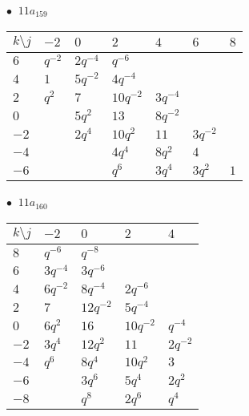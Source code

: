 \begin{minipage}{\linewidth}
$\bullet\ $ $11a_{159}$ \vspace{0.5em} \\
\begin{tabular}{l|llllll}
$k \setminus j$ & $-2$ & $0$ & $2$ & $4$ & $6$ & $8$ \\
\hline
$6$ & $q^{-2}$ & $2q^{-4}$ & $q^{-6}$ &  &  &  \\
$4$ & $1$ & $5q^{-2}$ & $4q^{-4}$ &  &  &  \\
$2$ & $q^{2}$ & $7$ & $10q^{-2}$ & $3q^{-4}$ &  &  \\
$0$ &  & $5q^{2}$ & $13$ & $8q^{-2}$ &  &  \\
$-2$ &  & $2q^{4}$ & $10q^{2}$ & $11$ & $3q^{-2}$ &  \\
$-4$ &  &  & $4q^{4}$ & $8q^{2}$ & $4$ &  \\
$-6$ &  &  & $q^{6}$ & $3q^{4}$ & $3q^{2}$ & $1$ \\
\end{tabular}
\vspace{2em}
\end{minipage}
%
\begin{minipage}{\linewidth}
$\bullet\ $ $11a_{160}$ \vspace{0.5em} \\
\begin{tabular}{l|llll}
$k \setminus j$ & $-2$ & $0$ & $2$ & $4$ \\
\hline
$8$ & $q^{-6}$ & $q^{-8}$ &  &  \\
$6$ & $3q^{-4}$ & $3q^{-6}$ &  &  \\
$4$ & $6q^{-2}$ & $8q^{-4}$ & $2q^{-6}$ &  \\
$2$ & $7$ & $12q^{-2}$ & $5q^{-4}$ &  \\
$0$ & $6q^{2}$ & $16$ & $10q^{-2}$ & $q^{-4}$ \\
$-2$ & $3q^{4}$ & $12q^{2}$ & $11$ & $2q^{-2}$ \\
$-4$ & $q^{6}$ & $8q^{4}$ & $10q^{2}$ & $3$ \\
$-6$ &  & $3q^{6}$ & $5q^{4}$ & $2q^{2}$ \\
$-8$ &  & $q^{8}$ & $2q^{6}$ & $q^{4}$ \\
\end{tabular}
\vspace{2em}
\end{minipage}
%

